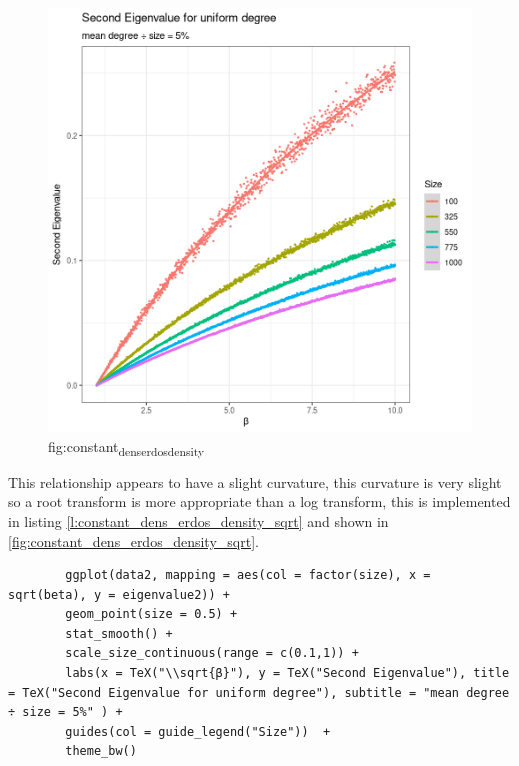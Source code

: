 \documentclass[11pt]{report}
\begin{document}
\begin{figure}[htbp]
\centering
\includegraphics[width=12cm]{media/constant_dens_erdos_density.png}
\caption{\label{fig:constant_dens_erdos_density}fig:constant\textsubscript{dens}\textsubscript{erdos}\textsubscript{density}}
\end{figure}

This relationship appears to have a slight curvature, this curvature is very slight so a root transform is more appropriate than a log transform, this is implemented in listing \ref{l:constant_dens_erdos_density_sqrt}  and shown in \ref{fig:constant_dens_erdos_density_sqrt}.

\begin{listing}[htbp]
    \begin{tcolorbox}
        \begin{verbatim}
        ggplot(data2, mapping = aes(col = factor(size), x = sqrt(beta), y = eigenvalue2)) +
        geom_point(size = 0.5) +
        stat_smooth() +
        scale_size_continuous(range = c(0.1,1)) +
        labs(x = TeX("\\sqrt{β}"), y = TeX("Second Eigenvalue"), title = TeX("Second Eigenvalue for uniform degree"), subtitle = "mean degree ÷ size = 5%" ) +
        guides(col = guide_legend("Size"))  +
        theme_bw()
        \end{verbatim}
    \end{tcolorbox}
\caption{\label{l:constant_dens_erdos_density_sqrt}listing:constant\textsubscript{size}\textsubscript{erdos}\textsubscript{density}\textsubscript{sqrt}}
\end{listing}
\end{document}
